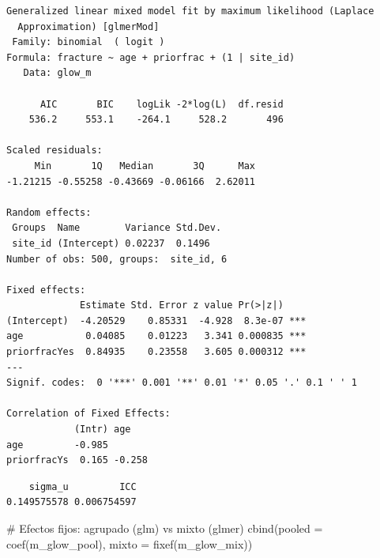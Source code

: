 \documentclass[
  letterpaper,
  DIV=11,
  numbers=noendperiod]{scrartcl}
\newenvironment{Shaded}{\begin{snugshade}}{\end{snugshade}}
\newcommand{\AttributeTok}[1]{\textcolor[rgb]{0.40,0.45,0.13}{#1}}
\newcommand{\CommentTok}[1]{\textcolor[rgb]{0.37,0.37,0.37}{#1}}
\newcommand{\DecValTok}[1]{\textcolor[rgb]{0.68,0.00,0.00}{#1}}
\newcommand{\FunctionTok}[1]{\textcolor[rgb]{0.28,0.35,0.67}{#1}}
\newcommand{\NormalTok}[1]{\textcolor[rgb]{0.00,0.23,0.31}{#1}}
\newcommand{\OtherTok}[1]{\textcolor[rgb]{0.00,0.23,0.31}{#1}}
\newcommand{\SpecialCharTok}[1]{\textcolor[rgb]{0.37,0.37,0.37}{#1}}
\begin{document}
\begin{verbatim}
Generalized linear mixed model fit by maximum likelihood (Laplace
  Approximation) [glmerMod]
 Family: binomial  ( logit )
Formula: fracture ~ age + priorfrac + (1 | site_id)
   Data: glow_m

      AIC       BIC    logLik -2*log(L)  df.resid 
    536.2     553.1    -264.1     528.2       496 

Scaled residuals: 
     Min       1Q   Median       3Q      Max 
-1.21215 -0.55258 -0.43669 -0.06166  2.62011 

Random effects:
 Groups  Name        Variance Std.Dev.
 site_id (Intercept) 0.02237  0.1496  
Number of obs: 500, groups:  site_id, 6

Fixed effects:
             Estimate Std. Error z value Pr(>|z|)    
(Intercept)  -4.20529    0.85331  -4.928  8.3e-07 ***
age           0.04085    0.01223   3.341 0.000835 ***
priorfracYes  0.84935    0.23558   3.605 0.000312 ***
---
Signif. codes:  0 '***' 0.001 '**' 0.01 '*' 0.05 '.' 0.1 ' ' 1

Correlation of Fixed Effects:
            (Intr) age   
age         -0.985       
priorfracYs  0.165 -0.258
\end{verbatim}

\begin{Shaded}
\end{Shaded}

\begin{verbatim}
    sigma_u         ICC 
0.149575578 0.006754597 
\end{verbatim}

\begin{Shaded}
\begin{Highlighting}[]
\CommentTok{\# Efectos fijos: agrupado (glm) vs mixto (glmer)}
\FunctionTok{cbind}\NormalTok{(}\AttributeTok{pooled =} \FunctionTok{coef}\NormalTok{(m\_glow\_pool), }\AttributeTok{mixto =} \FunctionTok{fixef}\NormalTok{(m\_glow\_mix))}
\end{Highlighting}
\end{Shaded}
\end{document}
